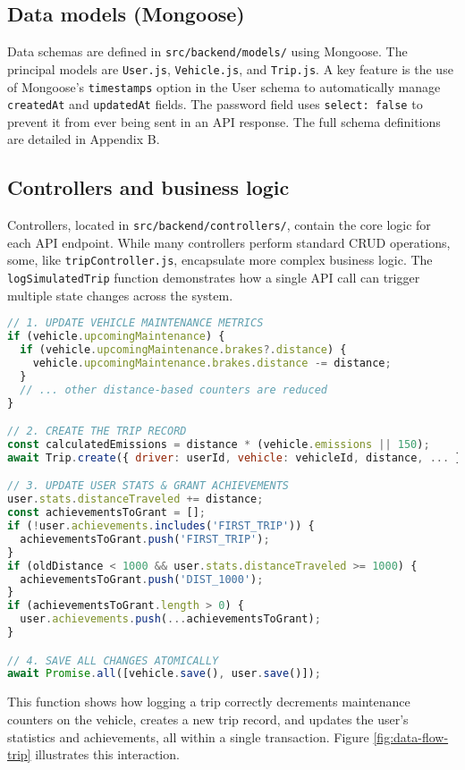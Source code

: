 \subsection{Data models (Mongoose)}
Data schemas are defined in \texttt{src/backend/models/} using Mongoose. The principal models are \texttt{User.js}, \texttt{Vehicle.js}, and \texttt{Trip.js}. A key feature is the use of Mongoose's \texttt{timestamps} option in the User schema to automatically manage \texttt{createdAt} and \texttt{updatedAt} fields. The password field uses \texttt{select: false} to prevent it from ever being sent in an API response. The full schema definitions are detailed in Appendix B.

\subsection{Controllers and business logic}
Controllers, located in \texttt{src/backend/controllers/}, contain the core logic for each API endpoint. While many controllers perform standard CRUD operations, some, like \texttt{tripController.js}, encapsulate more complex business logic. The \texttt{logSimulatedTrip} function demonstrates how a single API call can trigger multiple state changes across the system.

\begin{lstlisting}[language=JavaScript, caption={Core logic from \texttt{tripController.js}}]
// 1. UPDATE VEHICLE MAINTENANCE METRICS
if (vehicle.upcomingMaintenance) {
  if (vehicle.upcomingMaintenance.brakes?.distance) {
    vehicle.upcomingMaintenance.brakes.distance -= distance;
  }
  // ... other distance-based counters are reduced
}

// 2. CREATE THE TRIP RECORD
const calculatedEmissions = distance * (vehicle.emissions || 150);
await Trip.create({ driver: userId, vehicle: vehicleId, distance, ... });

// 3. UPDATE USER STATS & GRANT ACHIEVEMENTS
user.stats.distanceTraveled += distance;
const achievementsToGrant = [];
if (!user.achievements.includes('FIRST_TRIP')) {
  achievementsToGrant.push('FIRST_TRIP');
}
if (oldDistance < 1000 && user.stats.distanceTraveled >= 1000) {
  achievementsToGrant.push('DIST_1000');
}
if (achievementsToGrant.length > 0) {
  user.achievements.push(...achievementsToGrant);
}

// 4. SAVE ALL CHANGES ATOMICALLY
await Promise.all([vehicle.save(), user.save()]);
\end{lstlisting}

This function shows how logging a trip correctly decrements maintenance counters on the vehicle, creates a new trip record, and updates the user's statistics and achievements, all within a single transaction. Figure \ref{fig:data-flow-trip} illustrates this interaction.


